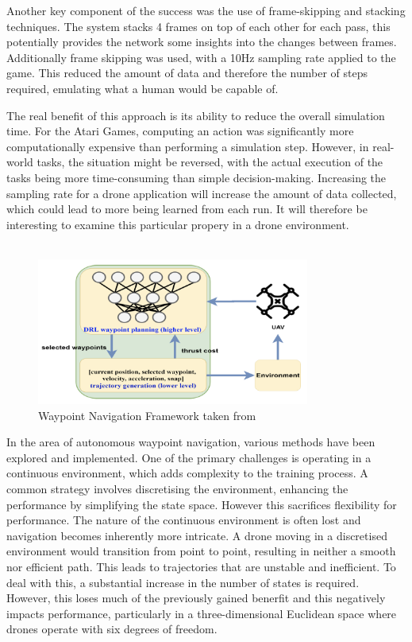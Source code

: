 Another key component of the success was the use of frame-skipping and stacking techniques.
The system stacks 4 frames on top of each other for each pass, this potentially provides the network some insights into the changes between frames.
Additionally frame skipping was used, with a 10Hz sampling rate applied to the game.
This reduced the amount of data and therefore the number of steps required, emulating what a human would be capable of.

The real benefit of this approach is its ability to reduce the overall simulation time.
For the Atari Games, computing an action was significantly more computationally expensive than performing a simulation step.
However, in real-world tasks, the situation might be reversed, with the actual execution of the tasks being more time-consuming than simple decision-making.
Increasing the sampling rate for a drone application will increase the amount of data collected, which could lead to more being learned from each run.
It will therefore be interesting to examine this particular propery in a drone environment. \\\\


\begin{figure}[htbp]
  \centering
  \includegraphics[width=0.8\textwidth]{background/fyp12-waypoint-nav-framework.png}
  \caption{Waypoint Navigation Framework taken from~\cite{fyp12-waypoint-navigation}}
\label{fig:fyp12-waypoint-nav-framework}
\end{figure}

In the area of autonomous waypoint navigation, various methods have been explored and implemented.
One of the primary challenges is operating in a continuous environment, which adds complexity to the training process.
A common strategy involves discretising the environment, enhancing the performance by simplifying the state space.
However this sacrifices flexibility for performance.
The nature of the continuous environment is often lost and navigation becomes inherently more intricate.
A drone moving in a discretised environment would transition from point to point, resulting in neither a smooth nor efficient path.
This leads to trajectories that are unstable and inefficient.
To deal with this, a substantial increase in the number of states is required.
However, this loses much of the previously gained benerfit and this negatively impacts performance, particularly in a three-dimensional Euclidean space where drones operate with six degrees of freedom.


